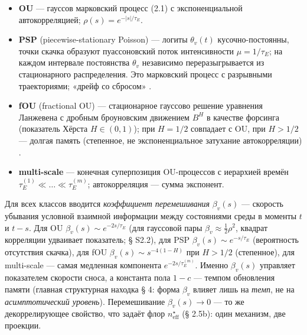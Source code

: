 \documentclass[12pt]{iopart}
\providecommand{\tightlist}{\setlength{\itemsep}{0pt}\setlength{\parskip}{0pt}}
\begin{document}
\begin{itemize}

\tightlist

\item

  \textbf{OU} --- гауссов марковский процесс (2.1) с экспоненциальной автокорреляцией; \(\rho(s) = e^{-|s|/\tau_E}\).

\item

  \textbf{PSP} (piecewise-stationary Poisson) --- логиты \(\theta_v(t)\) кусочно-постоянны, точки скачка образуют пуассоновский поток интенсивности \(\mu = 1/\tau_E\); на каждом интервале постоянства \(\theta_v\) независимо переразыгрывается из стационарного распределения. Это марковский процесс с разрывными траекториями; «дрейф со сбросом» \cite{Andriishin2026b}.

\item

  \textbf{fOU} (fractional OU) --- стационарное гауссово решение уравнения Ланжевена с дробным броуновским движением \(B^H\) в качестве форсинга (показатель Хёрста \(H \in (0,1)\)); при \(H = 1/2\) совпадает с OU, при \(H > 1/2\) --- долгая память (степенное, не экспоненциальное затухание автокорреляции) \cite{Mandelbrot1968,Cheridito2003}.

\item

  \textbf{multi-scale} --- конечная суперпозиция OU-процессов с иерархией времён \(\tau_E^{(1)} \ll \dots \ll \tau_E^{(m)}\); автокорреляция --- сумма экспонент.

\end{itemize}



Для всех классов вводится \emph{коэффициент перемешивания} \(\beta_v(s)\) --- скорость убывания условной взаимной информации между состояниями среды в моменты \(t\) и \(t-s\). Для OU \(\beta_v(s) \sim e^{-2s/\tau_E}\) (для гауссовой пары \(\beta_v \approx \tfrac12\rho^2\), квадрат корреляции удваивает показатель; § S2.2), для PSP \(\beta_v(s) \sim e^{-s/\tau_E}\) (вероятность отсутствия скачка), для fOU \(\beta_v(s) \sim s^{-4(1-H)}\) при \(H > 1/2\) (степенное), для multi-scale --- самая медленная компонента \(e^{-2s/\tau_E^{(m)}}\). Именно \(\beta_v(s)\) управляет показателем скорости сноса, а константа пола \(1 - c\) --- темпом обновления памяти (главная структурная находка § 4: форма \(\beta_v\) влияет лишь на \emph{темп}, не на \emph{асимптотический уровень}). Перемешивание \(\beta_v(s) \to 0\) --- то же декоррелирующее свойство, что задаёт флор \(n_{\text{eff}}^\star\) (§ 2.5b): один механизм, две проекции.
\end{document}
